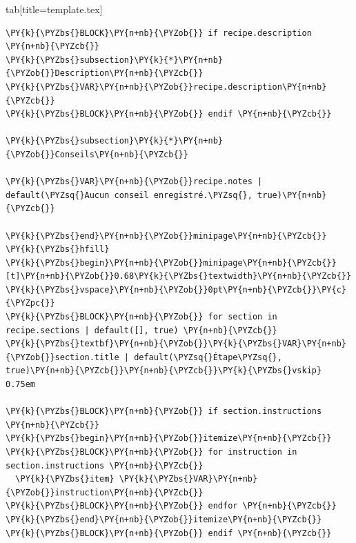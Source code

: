 \documentclass[a4paper,twoside]{article}
\begin{document}
\begin{tsdiv}{tab}[title=template.tex]
\begin{tscode}[lang=tex, engine=pygments]
\begin{Verbatim}[commandchars=\\\{\},breaklines, breakanywhere, commandchars=\\\{\}]
\PY{k}{\PYZbs{}BLOCK}\PY{n+nb}{\PYZob{}} if recipe.description \PY{n+nb}{\PYZcb{}}
\PY{k}{\PYZbs{}subsection}\PY{k}{*}\PY{n+nb}{\PYZob{}}Description\PY{n+nb}{\PYZcb{}}
\PY{k}{\PYZbs{}VAR}\PY{n+nb}{\PYZob{}}recipe.description\PY{n+nb}{\PYZcb{}}
\PY{k}{\PYZbs{}BLOCK}\PY{n+nb}{\PYZob{}} endif \PY{n+nb}{\PYZcb{}}

\PY{k}{\PYZbs{}subsection}\PY{k}{*}\PY{n+nb}{\PYZob{}}Conseils\PY{n+nb}{\PYZcb{}}

\PY{k}{\PYZbs{}VAR}\PY{n+nb}{\PYZob{}}recipe.notes | default(\PYZsq{}Aucun conseil enregistré.\PYZsq{}, true)\PY{n+nb}{\PYZcb{}}

\PY{k}{\PYZbs{}end}\PY{n+nb}{\PYZob{}}minipage\PY{n+nb}{\PYZcb{}}
\PY{k}{\PYZbs{}hfill}
\PY{k}{\PYZbs{}begin}\PY{n+nb}{\PYZob{}}minipage\PY{n+nb}{\PYZcb{}}[t]\PY{n+nb}{\PYZob{}}0.68\PY{k}{\PYZbs{}textwidth}\PY{n+nb}{\PYZcb{}}
\PY{k}{\PYZbs{}vspace}\PY{n+nb}{\PYZob{}}0pt\PY{n+nb}{\PYZcb{}}\PY{c}{\PYZpc{}}
\PY{k}{\PYZbs{}BLOCK}\PY{n+nb}{\PYZob{}} for section in recipe.sections | default([], true) \PY{n+nb}{\PYZcb{}}
\PY{k}{\PYZbs{}textbf}\PY{n+nb}{\PYZob{}}\PY{k}{\PYZbs{}VAR}\PY{n+nb}{\PYZob{}}section.title | default(\PYZsq{}Étape\PYZsq{}, true)\PY{n+nb}{\PYZcb{}}\PY{n+nb}{\PYZcb{}}\PY{k}{\PYZbs{}vskip} 0.75em

\PY{k}{\PYZbs{}BLOCK}\PY{n+nb}{\PYZob{}} if section.instructions \PY{n+nb}{\PYZcb{}}
\PY{k}{\PYZbs{}begin}\PY{n+nb}{\PYZob{}}itemize\PY{n+nb}{\PYZcb{}}
\PY{k}{\PYZbs{}BLOCK}\PY{n+nb}{\PYZob{}} for instruction in section.instructions \PY{n+nb}{\PYZcb{}}
  \PY{k}{\PYZbs{}item} \PY{k}{\PYZbs{}VAR}\PY{n+nb}{\PYZob{}}instruction\PY{n+nb}{\PYZcb{}}
\PY{k}{\PYZbs{}BLOCK}\PY{n+nb}{\PYZob{}} endfor \PY{n+nb}{\PYZcb{}}
\PY{k}{\PYZbs{}end}\PY{n+nb}{\PYZob{}}itemize\PY{n+nb}{\PYZcb{}}
\PY{k}{\PYZbs{}BLOCK}\PY{n+nb}{\PYZob{}} endif \PY{n+nb}{\PYZcb{}}


\end{Verbatim}
\end{tscode}
\end{tsdiv}
\end{document}
